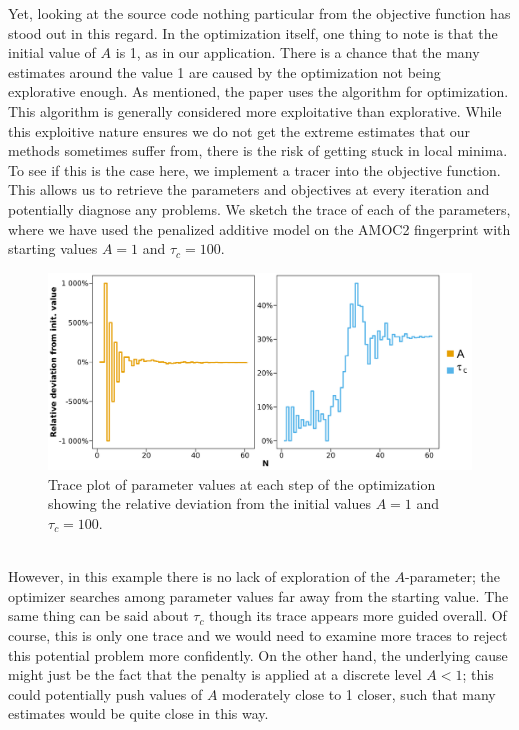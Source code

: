 Yet, looking at the source code nothing particular from the objective function has stood out in this regard. In the optimization itself, one thing to note is that the initial value of $A$ is 1, as in our application. There is a chance that the many estimates around the value 1 are caused by the optimization not being explorative enough. As mentioned, the paper uses the  algorithm for optimization. This algorithm is generally considered more exploitative than explorative. While this exploitive nature ensures we do not get the extreme estimates that our methods sometimes suffer from, there is the risk of getting stuck in local minima. To see if this is the case here, we implement a tracer into the objective function. This allows us to retrieve the parameters and objectives at every iteration and potentially diagnose any problems. We sketch the trace of each of the parameters, where we have used the penalized additive model on the AMOC2 fingerprint with starting values $A = 1$ and $\tau_c = 100$. 
\begin{figure}[h!]
\begin{center}
    \includegraphics[scale = .075]{figures/trace_plot.jpeg}
    \caption{Trace plot of parameter values at each step of the optimization showing the relative deviation from the initial values $A = 1$ and $\tau_c = 100$.}
    \label{figure:trace_plot}
\end{center}
\end{figure}\\
However, in this example there is no lack of exploration of the $A$-parameter; the optimizer searches among parameter values far away from the starting value. The same thing can be said about $\tau_c$ though its trace appears more guided overall. Of course, this is only one trace and we would need to examine more traces to reject this potential problem more confidently. On the other hand, the underlying cause might just be the fact that the penalty is applied at a discrete level $A<1$; this could potentially push values of $A$ moderately close to 1 closer, such that many estimates would be quite close in this way.

